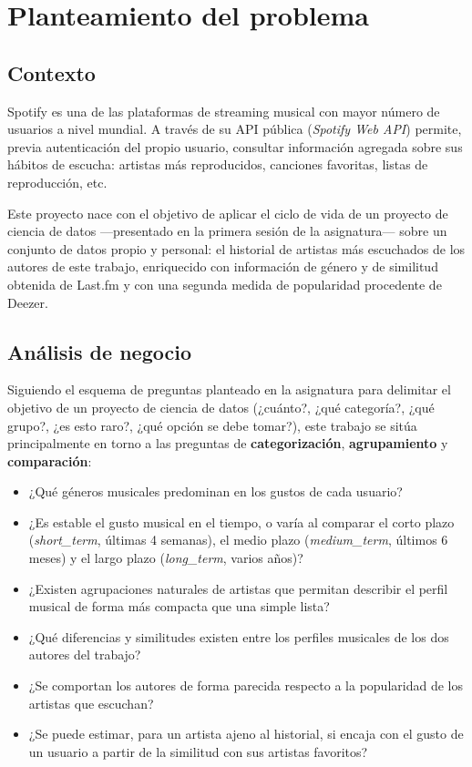 
\chapter{Planteamiento del problema}
\label{chap:planteamiento}

\section{Contexto}
\label{sec:contexto}

Spotify es una de las plataformas de streaming musical con mayor número de usuarios a nivel mundial. A través de su API pública (\emph{Spotify Web API}) permite, previa autenticación del propio usuario, consultar información agregada sobre sus hábitos de escucha: artistas más reproducidos, canciones favoritas, listas de reproducción, etc.

Este proyecto nace con el objetivo de aplicar el ciclo de vida de un proyecto de ciencia de datos ---presentado en la primera sesión de la asignatura--- sobre un conjunto de datos propio y personal: el historial de artistas más escuchados de los autores de este trabajo, enriquecido con información de género y de similitud obtenida de Last.fm y con una segunda medida de popularidad procedente de Deezer.

\section{Análisis de negocio}
\label{sec:analisis-negocio}

Siguiendo el esquema de preguntas planteado en la asignatura para delimitar el objetivo de un proyecto de ciencia de datos (¿cuánto?, ¿qué categoría?, ¿qué grupo?, ¿es esto raro?, ¿qué opción se debe tomar?), este trabajo se sitúa principalmente en torno a las preguntas de \textbf{categorización}, \textbf{agrupamiento} y \textbf{comparación}:

\begin{itemize}
    \item ¿Qué géneros musicales predominan en los gustos de cada usuario?
    \item ¿Es estable el gusto musical en el tiempo, o varía al comparar el corto plazo (\emph{short\_term}, últimas 4 semanas), el medio plazo (\emph{medium\_term}, últimos 6 meses) y el largo plazo (\emph{long\_term}, varios años)?
    \item ¿Existen agrupaciones naturales de artistas que permitan describir el perfil musical de forma más compacta que una simple lista?
    \item ¿Qué diferencias y similitudes existen entre los perfiles musicales de los dos autores del trabajo?
    \item ¿Se comportan los autores de forma parecida respecto a la popularidad de los artistas que escuchan?
    \item ¿Se puede estimar, para un artista ajeno al historial, si encaja con el gusto de un usuario a partir de la similitud con sus artistas favoritos?
\end{itemize}


